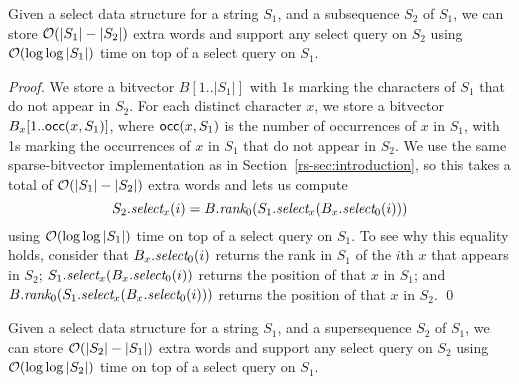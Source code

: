 \begin{lemma}
\label{rs-lem:subsequence}
Given a select data structure for a string $S_1$, and a subsequence $S_2$ of $S_1$, we can store $\mathcal{O}\!\left( |S_1| - |S_2| \right)$ extra words and support any select query on $S_2$ using $\mathcal{O}\!\left( \log \log |S_1| \right)$ time on top of a select query on $S_1$.
\end{lemma}

\begin{proof}
We store a bitvector \(B [1..|S_1|]\) with 1s marking the characters of $S_1$ that do not appear in $S_2$.  For each distinct character $x$, we store a bitvector \(B_x [1..\mathsf{occ} (x, S_1)]\), where \(\mathsf{occ} (x, S_1)\) is the number of occurrences of $x$ in $S_1$, with 1s marking the occurrences of $x$ in $S_1$ that do not appear in $S_2$.  We use the same sparse-bitvector implementation as in Section~\ref{rs-sec:introduction}, so this takes a total of $\mathcal{O}\!\left( |S_1| - |S_2| \right)$ extra words and lets us compute
\[S_2.\textit{select}_x (i) = B.\textit{rank}_0 (S_1.\textit{select}_x (B_x.\textit{select}_0 (i)))\]
using $\mathcal{O}\!\left( \log \log |S_1| \right)$ time on top of a select query on $S_1$.  To see why this equality holds, consider that \(B_x.\textit{select}_0 (i)\) returns the rank in $S_1$ of the $i$th $x$ that appears in $S_2$; \(S_1.\textit{select}_x (B_x.\textit{select}_0 (i))\) returns the position of that $x$ in $S_1$; and \(B.\textit{rank}_0 (S_1.\textit{select}_x (B_x.\textit{select}_0 (i)))\) returns the position of that $x$ in $S_2$.
\qed
\end{proof}

\begin{lemma}
\label{rs-lem:supersequence}
Given a select data structure for a string $S_1$, and a supersequence $S_2$ of $S_1$, we can store $\mathcal{O}\!\left( |S_2| - |S_1| \right)$ extra words and support any select query on $S_2$ using $\mathcal{O}\!\left( \log \log |S_2| \right)$ time on top of a select query on $S_1$.
\end{lemma}

